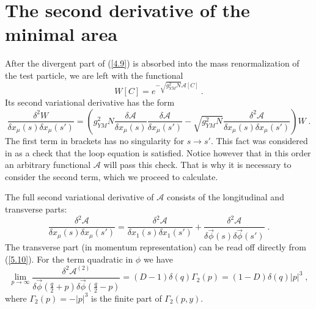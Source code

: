 \documentclass[a4paper,12pt]{article}
\numberwithin{equation}{section}
\begin{document}
\section{The second derivative of the minimal area}

After the divergent part of (\ref{4.9}) is absorbed into the mass renormalization
of the test particle, we are left with the functional 
\begin{equation}
\label{7.05}
W[C]=e^{-\sqrt{{g^{2}_{YM}N}}\mathcal{A}[C]}\: .
\end{equation}
 Its second variational derivative has the form
\[
\frac{\delta ^{2}W}{\delta x_{\mu }(s)\delta x_{\mu }(s')}=\left( g^{2}_{YM}N\frac{\delta \mathcal{A}}{\delta x_{\mu }(s)}\frac{\delta \mathcal{A}}{\delta x_{\mu }(s')}-\sqrt{{g^{2}_{YM}N}}\frac{\delta ^{2}\mathcal{A}}{\delta x_{\mu }(s)\delta x_{\mu }(s')}\right) W\; .\]
 The first term in brackets has no singularity for \( s\to s' \). This fact
was considered in \cite{15} as a check that the loop equation is satisfied.
Notice however that in this order an arbitrary functional \( \mathcal {A} \)
will pass this check. That is why it is necessary to consider the second term,
which we proceed to calculate. 

The full second variational derivative of \( \mathcal {A} \) consists of the
longitudinal and transverse parts:
\begin{equation}
\label{7.1}
\frac{\delta ^{2}\mathcal{A}}{\delta x_{\mu }(s)\delta x_{\mu }(s')}=\frac{\delta ^{2}\mathcal{A}}{\delta x_{1}(s)\delta x_{1}(s')}+\frac{\delta ^{2}\mathcal{A}}{\delta \vec{\phi }(s)\delta \vec{\phi }(s')}\; .
\end{equation}
The transverse part (in momentum representation) can be read off directly from
(\ref{5.10}). For the term quadratic in \( \phi  \) we have 
\[
\lim _{p\to \infty }\frac{\delta ^{2}\mathcal{A}^{(2)}}{\delta \vec{\phi }\left( \frac{q}{2}+p\right) \delta \vec{\phi }\left( \frac{q}{2}-p\right) }=(D-1)\delta (q)\Gamma _{2}(p)=(1-D)\delta (q)|p|^{3}\; ,\]
where \( \Gamma _{2}(p)=-|p|^{3} \) is the finite part of \( \Gamma _{2}(p,y) \). 
\end{document}
